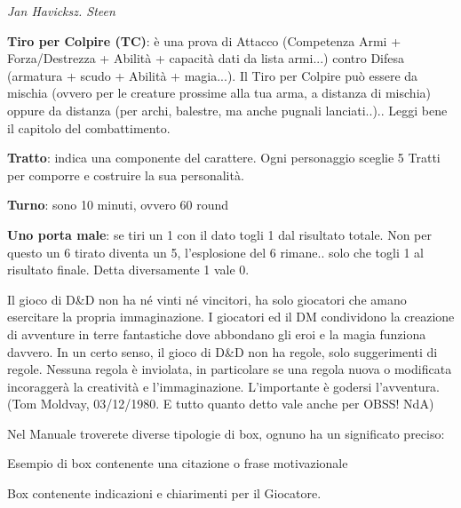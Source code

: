 \begin{multicols}{2}
\begin{center}
\emph{Jan Havicksz. Steen}
\end{center}

\textbf{Tiro per Colpire (TC)}: è una prova di Attacco (Competenza Armi + Forza/Destrezza + Abilità + capacità dati da lista armi...) contro Difesa (armatura + scudo + Abilità + magia...). Il Tiro per Colpire può essere da mischia (ovvero per le creature prossime alla tua arma, a distanza di mischia) oppure da distanza (per archi, balestre, ma anche pugnali lanciati..).. Leggi bene il capitolo del combattimento.

\textbf{Tratto}: indica una componente del carattere. Ogni personaggio sceglie 5 Tratti per comporre e costruire la sua personalità.

\textbf{Turno}: sono 10 minuti, ovvero 60 round

\textbf{Uno porta male}: se tiri un 1 con il dato togli 1 dal risultato totale. Non per questo un 6 tirato diventa un 5, l'esplosione del 6 rimane.. solo che togli 1 al risultato finale. Detta diversamente 1 vale 0.

\begin{changemargin}{0.3cm}{0.3cm}\begin{enfasi}{
Il gioco di D\&D non ha né vinti né vincitori, ha solo giocatori che amano esercitare la propria immaginazione. I giocatori ed il DM condividono la creazione di avventure in terre fantastiche dove abbondano gli eroi e la magia funziona davvero. In un certo senso, il gioco di D\&D non ha regole, solo suggerimenti di regole. Nessuna regola è inviolata, in particolare se una regola nuova o modificata incoraggerà la creatività e l'immaginazione. L'importante è godersi l'avventura. (Tom Moldvay, 03/12/1980. E tutto quanto detto vale anche per OBSS! NdA)
}\end{enfasi}\end{changemargin}

\medskip

Nel Manuale troverete diverse tipologie di box, ognuno ha un significato preciso:

\medskip

\begin{changemargin}{0.3cm}{0.3cm}\begin{enfasi}{Esempio di box contenente una citazione o frase motivazionale}\end{enfasi}\end{changemargin}

\begin{changemargin}{0.3cm}{0.3cm}\begin{tcolorbox}[title = Informazioni per il giocatore]Box contenente indicazioni e chiarimenti per il Giocatore.\end{tcolorbox}\end{changemargin}


\end{multicols}
